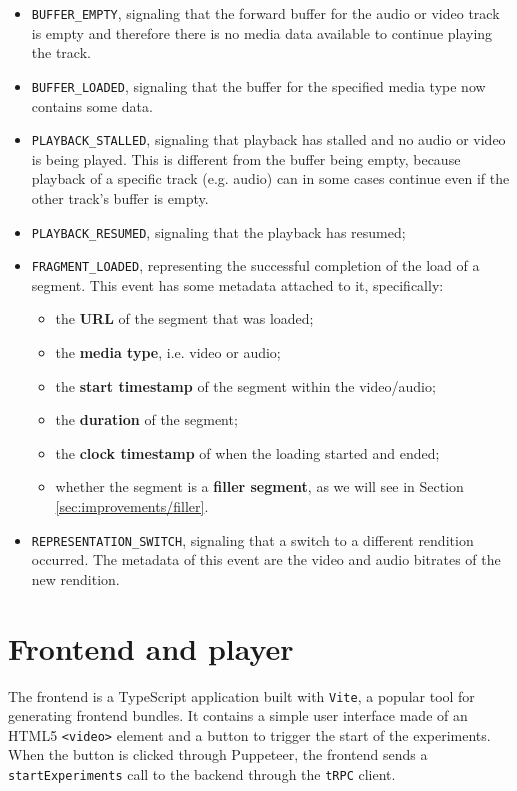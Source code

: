 \begin{itemize}
    \item \texttt{BUFFER\_EMPTY}, signaling that the forward buffer for the audio or video track is empty and therefore there is no media data available to continue playing the track.
    \item \texttt{BUFFER\_LOADED}, signaling that the buffer for the specified media type now contains some data.
    \item \texttt{PLAYBACK\_STALLED}, signaling that playback has stalled and no audio or video is being played. This is different from the buffer being empty, because playback of a specific track (e.g. audio) can in some cases continue even if the other track's buffer is empty.
    \item \texttt{PLAYBACK\_RESUMED}, signaling that the playback has resumed;
    \item \texttt{FRAGMENT\_LOADED}, representing the successful completion of the load of a segment. This event has some metadata attached to it, specifically:
        \begin{itemize}
            \item the \textbf{URL} of the segment that was loaded;
            \item the \textbf{media type}, i.e. video or audio;
            \item the \textbf{start timestamp} of the segment within the video/audio;
            \item the \textbf{duration} of the segment;
            \item the \textbf{clock timestamp} of when the loading started and ended;
            \item whether the segment is a \textbf{filler segment}, as we will see in Section \ref{sec:improvements/filler}.
        \end{itemize}
    \item \texttt{REPRESENTATION\_SWITCH}, signaling that a switch to a different rendition occurred. The metadata of this event are the video and audio bitrates of the new rendition.
\end{itemize}

\section{Frontend and player}
\label{sec:testbed/frontend}

The frontend is a TypeScript application built with \texttt{Vite}, a popular tool for generating frontend bundles. It contains a simple user interface made of an HTML5 \texttt{<video>} element and a button to trigger the start of the experiments. When the button is clicked through Puppeteer, the frontend sends a \texttt{startExperiments} call to the backend through the \texttt{tRPC} client.

